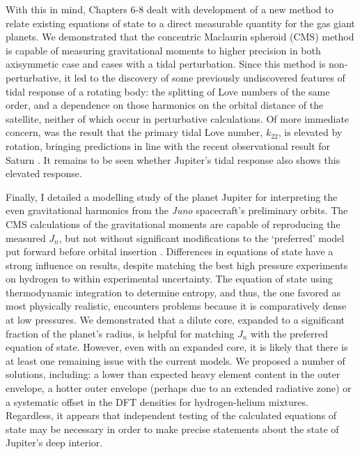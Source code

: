 With this in mind, Chapters 6-8 dealt with development of a new method to relate
existing equations of state to a direct measurable quantity for the gas giant
planets. We demonstrated that the concentric Maclaurin spheroid (CMS) method is
capable of measuring gravitational moments to higher precision in both axisymmetic
case and cases with a tidal perturbation. Since this method is non-perturbative, it
led to the discovery of some previously undiscovered features of tidal response of a
rotating body: the splitting of Love numbers of the same order, and a dependence on
those harmonics on the orbital distance of the satellite, neither of which occur in
perturbative calculations. Of more immediate concern, was the result that the primary
tidal Love number, $k_{22}$, is elevated by rotation, bringing predictions in line
with the recent observational result for Saturn \citep{lainey2016}. It remains to be
seen whether Jupiter's tidal response also shows this elevated response.

Finally, I detailed a modelling study of the planet Jupiter for interpreting the even
gravitational harmonics from the \textit{Juno} spacecraft's preliminary orbits. The
CMS calculations of the gravitational moments are capable of reproducing the measured
$J_n$, but not without significant modifications to the `preferred' model put forward
before orbital insertion \citep{hubbard2016}. Differences in equations of state have
a strong influence on results, despite matching the best high pressure
experiments on hydrogen to within experimental uncertainty. The equation of state
using thermodynamic integration to determine entropy, and thus, the one favored as
most physically realistic, encounters problems because it is comparatively dense at
low pressures. We demonstrated that a dilute core, expanded to a significant fraction
of the planet's radius, is helpful for matching $J_n$ with the preferred equation of
state. However, even with an expanded core, it is likely that there is at least one
remaining issue with the current models. We proposed a number of solutions,
including: a lower than expected heavy element content in the outer envelope, a
hotter outer envelope (perhaps due to an extended radiative zone) or a systematic
offset in the DFT densities for hydrogen-helium mixtures. Regardless, it appears that
independent testing of the calculated equations of state may be necessary in order to
make precise statements about the state of Jupiter's deep interior.
